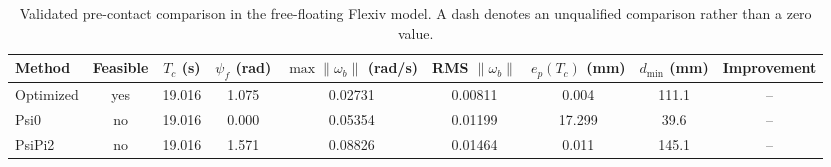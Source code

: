 \begin{table}[t]
\centering
\caption{Validated pre-contact comparison in the free-floating Flexiv model. A dash denotes an unqualified comparison rather than a zero value.}
\label{tab:precontact_comparison}
\begin{tabular}{lcccccccc}
\toprule
Method & Feasible & $T_c$ (s) & $\psi_f$ (rad) & $\max\|\omega_b\|$ (rad/s) & RMS $\|\omega_b\|$ & $e_p(T_c)$ (mm) & $d_{\min}$ (mm) & Improvement \\
\midrule
Optimized & yes & 19.016 & 1.075 & 0.02731 & 0.00811 & 0.004 & 111.1 & -- \\
Psi0 & no & 19.016 & 0.000 & 0.05354 & 0.01199 & 17.299 & 39.6 & -- \\
PsiPi2 & no & 19.016 & 1.571 & 0.08826 & 0.01464 & 0.011 & 145.1 & -- \\
\bottomrule
\end{tabular}
\end{table}
